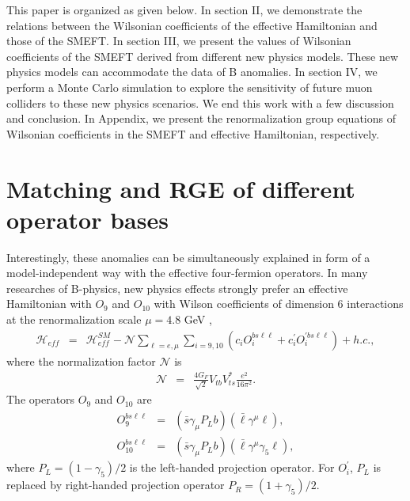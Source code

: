 \documentclass[a4paper,11pt]{article}
\begin{document}
This paper is organized as given below. In section II, we demonstrate the relations between the Wilsonian coefficients of the effective Hamiltonian and those of the SMEFT. In section III, we present the values of Wilsonian coefficients of the SMEFT derived from different new physics models. These new physics models can accommodate the data of B anomalies. In section IV, we perform a Monte Carlo simulation to explore the sensitivity of future muon colliders to these new physics scenarios. We end this work with a few discussion and conclusion. In Appendix, we present the renormalization group equations of Wilsonian coefficients in the SMEFT and effective Hamiltonian, respectively. 


\section{Matching and RGE of different operator bases}
\label{Sec:EFT}

 Interestingly, these anomalies can be simultaneously explained in form of a model-independent way with the effective four-fermion operators. 
In many researches of B-physics,  new physics effects strongly prefer an effective Hamiltonian with $O_9 $ and $O_{10}$ with Wilson coefficients of dimension 6 interactions at the renormalization scale $\mu =4.8$ GeV ,
\begin{eqnarray}
  \mathcal{H}_{eff} &=& \mathcal{H}^{SM}_{eff}-\mathcal{N}\sum_{\ell=e,\mu}\sum_{i=9,10}\left(c_iO^{bs\ell\ell}_i+c^\prime_i O^{\prime bs\ell\ell}_i\right) + h.c., 
\end{eqnarray} 
where the normalization factor $\mathcal{N}$ is 
\begin{eqnarray}
  \mathcal{N} &=& \frac{4G_F}{\sqrt{2}}V_{tb}V^*_{ts}\frac{e^2}{16\pi^2}. 
\end{eqnarray}
The operators $O_9$ and $O_{10}$ are 
\begin{eqnarray}
   O^{bs\ell\ell}_9 &=& (\bar{s}\gamma_\mu P_L b)(\bar{\ell}\gamma^{\mu}\ell),  \\
   O^{bs\ell\ell}_{10} &=& (\bar{s}\gamma_\mu P_L b)(\bar{\ell}\gamma^{\mu}\gamma_5\ell),
\end{eqnarray}
where $P_L=(1-\gamma_5)/2$ is the left-handed projection operator. 
For $O^\prime_i$, $P_L$ is replaced by right-handed projection operator $P_R=(1+\gamma_5)/2$.
\end{document}
